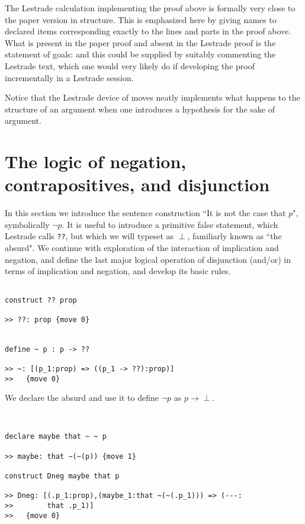 \documentclass[12pt]{article}
\begin{document}
The Lestrade calculation implementing the proof above is formally very close to the paper version in structure.  This is emphasized here by giving names to declared items corresponding exactly to the lines and parts in the proof above.   What is present in the paper proof and absent in the Lestrade proof is the statement of goals:  and this could be supplied by suitably commenting the Lestrade text, which one would very likely do if developing the proof incrementally in a Lestrade session.

Notice that the Lestrade device of moves neatly implements what happens to the structure of an argument when one introduces a hypothesis for the sake of argument.

\newpage


\section{The logic of negation, contrapositives, and disjunction}

In this section we introduce the sentence construction ``It is not the case that $p$", symbolically $\neg p$.  It is useful to introduce a primitive false statement, which Lestrade
calls {\tt ??}, but which we will typeset as $\perp$, familiarly known as ``the absurd".  We continue with exploration of the interaction of implication and negation, and define the last major logical operation of disjunction (and/or) in terms of implication and negation, and develop its basic rules.

\begin{verbatim}

construct ?? prop

>> ??: prop {move 0}


define ~ p : p -> ??

>> ~: [(p_1:prop) => ((p_1 -> ??):prop)]
>>   {move 0}

\end{verbatim}

We declare the absurd and use it to define $\neg p$ as $p \rightarrow \perp$.

\begin{verbatim}


declare maybe that ~ ~ p

>> maybe: that ~(~(p)) {move 1}

construct Dneg maybe that p

>> Dneg: [(.p_1:prop),(maybe_1:that ~(~(.p_1))) => (---:
>>        that .p_1)]
>>   {move 0}

\end{verbatim}
\end{document}
